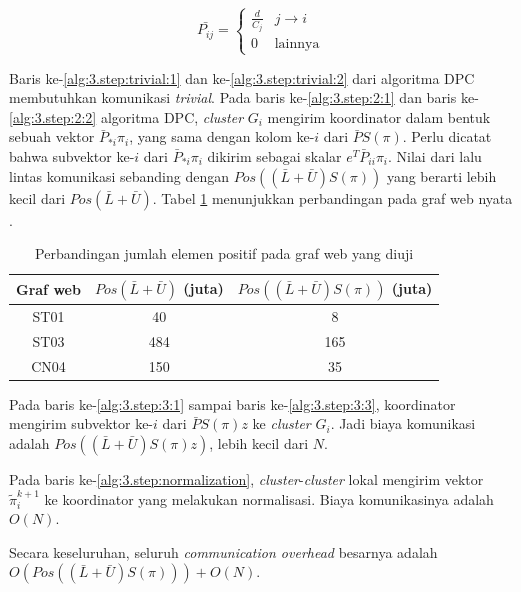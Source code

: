 \begin{equation}
	\bar{P_{ij}} =
	\begin{cases}
		\frac{d}{C_j} & j \rightarrow i \\
		0 & \text{lainnya}
	\end{cases}
\end{equation}

Baris ke-\ref{alg:3.step:trivial:1} dan ke-\ref{alg:3.step:trivial:2} dari algoritma DPC membutuhkan komunikasi \textit{trivial}. Pada baris ke-\ref{alg:3.step:2:1} dan baris ke-\ref{alg:3.step:2:2} algoritma DPC, \textit{cluster} $G_i$ mengirim koordinator dalam bentuk sebuah vektor $\bar{P}_{*i}\pi_i$, yang sama dengan kolom ke-$i$ dari $\bar{P}S(\pi)$. Perlu dicatat bahwa subvektor ke-$i$ dari $\bar{P}_{*i}\pi_i$ dikirim sebagai skalar $e^T\bar{P}_{ii}\pi_i$. Nilai dari lalu lintas komunikasi sebanding dengan $Pos((\bar{L} + \bar{U})S(\pi))$ yang berarti lebih kecil dari $Pos(\bar{L} + \bar{U})$. Tabel \ref{table:2} menunjukkan perbandingan pada graf web nyata \citep{zhuetal2005distributedPagerank}.

\begin{table}[h!]
	\centering
	\caption{Perbandingan jumlah elemen positif pada graf web yang diuji \citep{zhuetal2005distributedPagerank}}
	\label{table:2} 
	\begin{tabular}{|c|c|c|}
		\hline
			Graf web & $Pos(\bar{L} + \bar{U})$ (juta) & $Pos((\bar{L} + \bar{U})S(\pi))$ (juta) \\
		\hline
		
		\hline
			ST01 & 40 & 8 \\
			ST03 & 484 & 165 \\
			CN04 & 150 & 35 \\
		\hline
	\end{tabular}
\end{table}

Pada baris ke-\ref{alg:3.step:3:1} sampai baris ke-\ref{alg:3.step:3:3}, koordinator mengirim subvektor ke-$i$ dari $\bar{P}S(\pi)z$ ke \textit{cluster} $G_i$. Jadi biaya komunikasi adalah $Pos((\bar{L} + \bar{U})S(\pi)z)$, lebih kecil dari $N$.

Pada baris ke-\ref{alg:3.step:normalization}, \textit{cluster}-\textit{cluster} lokal mengirim vektor $\widetilde{\pi}^{k+1}_i$ ke koordinator yang melakukan normalisasi. Biaya komunikasinya adalah $O(N)$.

Secara keseluruhan, seluruh \textit{communication overhead} besarnya adalah $O(Pos((\bar{L} + \bar{U})S(\pi))) + O(N)$.